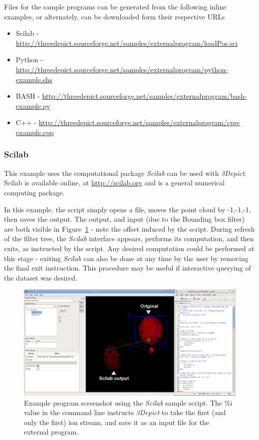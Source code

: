 \documentclass[10pt]{article}
\begin{document}
Files for the sample programs can be generated from the following inline examples, or alternately, can be downloaded form their respective URLs

\begin{itemize}
 \item Scilab - \url{http://threedepict.sourceforge.net/samples/externalprogram/loadPos.sci}
 \item Python - \url{http://threedepict.sourceforge.net/samples/externalprogram/python-example.shs}
 \item BASH - \url{http://threedepict.sourceforge.net/samples/externalprogram/bash-example.py}
 \item C++ - \url{http://threedepict.sourceforge.net/samples/externalprogram/cpp-example.cpp}
\end{itemize}



\subsubsection{Scilab}
This example uses the computational package \emph{Scilab} can be used with \emph{3Depict}. Scilab is available online, at \url{http://scilab.org} and is a general numerical computing package. 

In this example, the script simply opens a file, moves the point cloud by -1,-1,-1, then saves the output. The output, and input (due to the Bounding box filter) are both visible in Figure~\ref{fig:externalProgScilabSample} - note the offset induced by the script. During refresh of the filter tree, the \emph{Scilab} interface appears, performs its computation, and then exits, as instructed by the script. Any desired computation could be performed at this stage - exiting \emph{Scilab} can also be done at any time by the user by removing the final exit instruction. This procedure may be useful if interactive querying of the dataset was desired.

\begin{figure}
\begin{center}
 \includegraphics[keepaspectratio=true,width=0.9 \textwidth]{./figures/externalProgScilab.png}
 \caption{Example program screenshot using the \emph{Scilab} sample script. The \%i value in the command line instructs \emph{3Depict} to take the first (and only the first) ion stream, and save it as an input file for the external program. }
 \label{fig:externalProgScilabSample}
\end{center}
\end{figure}
\end{document}
